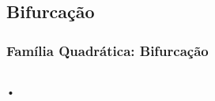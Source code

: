 \subsection{Bifurcação}


\begin{frame}
\vspace{5pt}
\frametitle{Família Quadrática: Bifurcação}
\begin{columns}
\column{\dimexpr\paperwidth-15pt}

•

\end{columns}
\end{frame}
